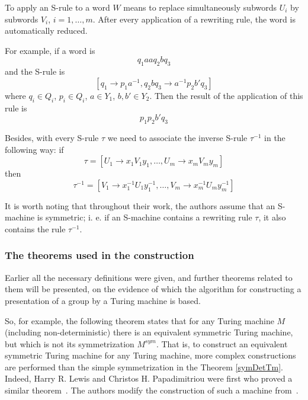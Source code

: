 \documentclass[conference]{IEEEtran}
\theoremstyle{definition}
\begin{document}
To apply an S-rule to a word $W$ means to replace simultaneously
subwords $U_i$ by subwords $V_i$, $i = 1, \dots, m$. After every application of
a rewriting rule, the word is automatically reduced.

For example, if a word is
$$q_1 a a q_2 b q_3$$
and the S-rule is
$$[q_1 \to p_1 a^{-1}, q_2 b q_3 \to a^{-1} p_2 b' q_3]$$
where $q_i \in Q_i$, $p_i \in Q_i$, $a \in Y_1$, $b, b' \in Y_2$. Then the result
of the application of this rule is
$$p_1 p_2 b' q_3$$

Besides, with every S-rule $\tau$ we need to associate the inverse S-rule $\tau^{-1}$ in the following way: if
$$\tau = [U_1 \to x_1 V_1 y_1, \dots, U_m \to x_m V_m y_m]$$
then
$$\tau^{-1} = [V_1 \to x_1^{-1} U_1 y_1^{-1}, \dots, V_m \to x_m^{-1} U_m y_m^{-1}]$$

It is worth noting that throughout their work, the authors assume that
an S-machine is symmetric; i. e. if an S-machine contains
a rewriting rule $\tau$, it also contains the rule $\tau^{-1}$.

\subsubsection{The theorems used in the construction}

Earlier all the necessary definitions were given, and further theorems related to them will be presented,
on the evidence of which the algorithm for constructing a presentation of a group by a Turing machine is based.

So, for example, the following theorem states that for any Turing machine $ M $ (including non-deterministic) there is an equivalent symmetric Turing machine, but which is not its symmetrization $ M^{sym} $. That is, to construct an equivalent symmetric Turing machine for any Turing machine, more complex constructions are performed than the simple symmetrization in the Theorem \ref{symDetTm}.
Indeed, Harry R. Lewis and Christos H. Papadimitriou were first who proved a similar theorem~\cite{LEWIS1982161}. The authors modify the construction of such a machine from~\cite{symTM}.
\end{document}
